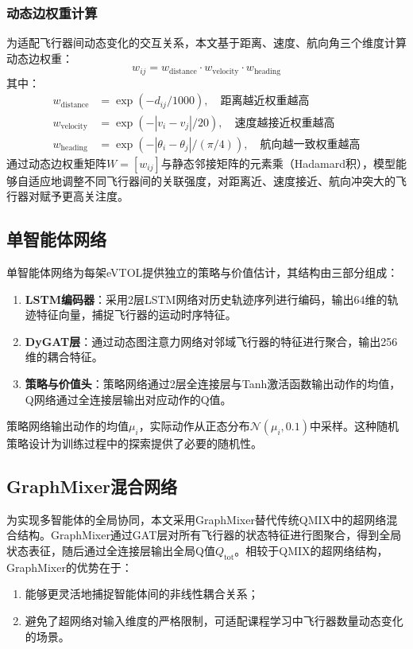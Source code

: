 \documentclass[12pt,a4paper,UTF8]{ctexart}
\begin{document}
\subsubsection{动态边权重计算}
为适配飞行器间动态变化的交互关系，本文基于距离、速度、航向角三个维度计算动态边权重：
\begin{equation}
    w_{ij} = w_{\text{distance}} \cdot w_{\text{velocity}} \cdot w_{\text{heading}}
\end{equation}
其中：
\begin{align}
    w_{\text{distance}} &= \exp(-d_{ij}/1000), \quad \text{距离越近权重越高} \\
    w_{\text{velocity}} &= \exp(-|v_i - v_j|/20), \quad \text{速度越接近权重越高} \\
    w_{\text{heading}} &= \exp(-|\theta_i - \theta_j|/(\pi/4)), \quad \text{航向越一致权重越高}
\end{align}
通过动态边权重矩阵$W = [w_{ij}]$与静态邻接矩阵的元素乘（Hadamard积），模型能够自适应地调整不同飞行器间的关联强度，对距离近、速度接近、航向冲突大的飞行器对赋予更高关注度。

\subsection{单智能体网络}
单智能体网络为每架eVTOL提供独立的策略与价值估计，其结构由三部分组成：
\begin{enumerate}[label=(\arabic*)]
    \item \textbf{LSTM编码器}：采用2层LSTM网络对历史轨迹序列进行编码，输出64维的轨迹特征向量，捕捉飞行器的运动时序特征。
    \item \textbf{DyGAT层}：通过动态图注意力网络对邻域飞行器的特征进行聚合，输出256维的耦合特征。
    \item \textbf{策略与价值头}：策略网络通过2层全连接层与Tanh激活函数输出动作的均值，Q网络通过全连接层输出对应动作的Q值。
\end{enumerate}

策略网络输出动作的均值$\mu_i$，实际动作从正态分布$\mathcal{N}(\mu_i, 0.1)$中采样。这种随机策略设计为训练过程中的探索提供了必要的随机性。

\subsection{GraphMixer混合网络}
为实现多智能体的全局协同，本文采用GraphMixer替代传统QMIX中的超网络混合结构\cite{ref2}。GraphMixer通过GAT层对所有飞行器的状态特征进行图聚合，得到全局状态表征，随后通过全连接层输出全局Q值$Q_{\text{tot}}$。相较于QMIX的超网络结构，GraphMixer的优势在于：
\begin{enumerate}[label=(\arabic*)]
    \item 能够更灵活地捕捉智能体间的非线性耦合关系；
    \item 避免了超网络对输入维度的严格限制，可适配课程学习中飞行器数量动态变化的场景。
\end{enumerate}
\end{document}
